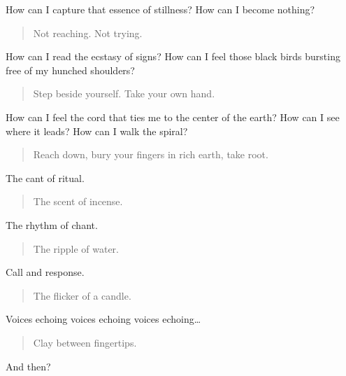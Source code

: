 How can I capture that essence of stillness? How can I become nothing?

\begin{quote}
Not reaching. Not trying.
\end{quote}

How can I read the ecstasy of signs? How can I feel those black birds bursting free of my hunched shoulders?

\begin{quote}
Step beside yourself. Take your own hand.
\end{quote}

How can I feel the cord that ties me to the center of the earth? How can I see where it leads? How can I walk the spiral?

\begin{quote}
Reach down, bury your fingers in rich earth, take root.
\end{quote}

The cant of ritual.

\begin{quote}
The scent of incense.
\end{quote}

The rhythm of chant.

\begin{quote}
The ripple of water.
\end{quote}

Call and response.

\begin{quote}
The flicker of a candle.
\end{quote}

Voices echoing voices echoing voices echoing\ldots{}

\begin{quote}
Clay between fingertips.
\end{quote}

And then?

